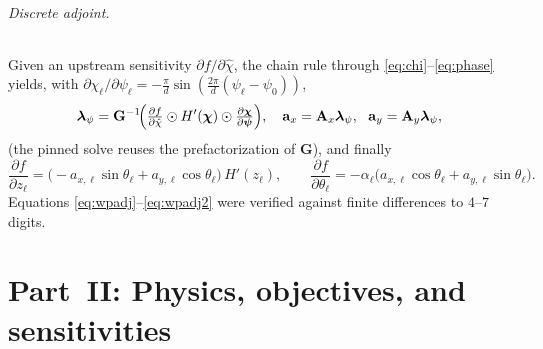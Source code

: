 \documentclass[11pt]{article}
\newcommand{\vA}{\mathbf{A}}
\newcommand{\vG}{\mathbf{G}}
\begin{document}
\paragraph{Discrete adjoint.}
Given an upstream sensitivity $\partial f/\partial\hat\chi$, the chain rule
through \eqref{eq:chi}--\eqref{eq:phase} yields, with
$\partial\chi_\ell/\partial\psi_\ell=-\tfrac\pi d\sin(\tfrac{2\pi}{d}
(\psi_\ell-\psi_0))$,
\begin{equation}
  \bm\lambda_\psi=\vG^{-1}\!\Bigl(\tfrac{\partial f}{\partial\hat\chi}\odot
  H'(\bm\chi)\odot\tfrac{\partial\bm\chi}{\partial\bm\psi}\Bigr),\quad
  \mathbf{a}_x=\vA_x\bm\lambda_\psi,\ \ \mathbf{a}_y=\vA_y\bm\lambda_\psi,
  \label{eq:wpadj}
\end{equation}
(the pinned solve reuses the prefactorization of $\vG$), and finally
\begin{equation}
  \frac{\partial f}{\partial z_\ell}=\bigl(-a_{x,\ell}\sin\theta_\ell+
  a_{y,\ell}\cos\theta_\ell\bigr)\,H'(z_\ell),\qquad
  \frac{\partial f}{\partial\theta_\ell}=-\alpha_\ell\bigl(a_{x,\ell}
  \cos\theta_\ell+a_{y,\ell}\sin\theta_\ell\bigr).
  \label{eq:wpadj2}
\end{equation}
Equations \eqref{eq:wpadj}--\eqref{eq:wpadj2} were verified against finite
differences to $4$--$7$ digits.

\part*{Part~II: Physics, objectives, and sensitivities}
\end{document}
